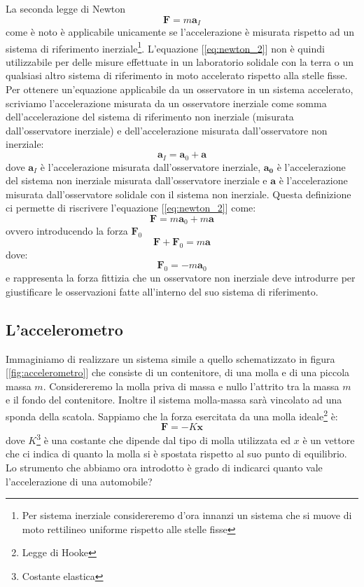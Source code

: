 \documentclass[a4paper,10pt,oneside]{article}
\begin{document}
La seconda legge di Newton
\begin{equation}\label{eq:newton_2}
 \mathbf{F}=m\mathbf{a}_I
\end{equation}
come è noto è applicabile unicamente se l'accelerazione è misurata rispetto ad un sistema di riferimento inerziale\footnote{Per sistema inerziale considereremo d'ora innanzi un sistema che si muove di moto rettilineo uniforme rispetto alle stelle fisse}. L'equazione [\ref{eq:newton_2}] non è quindi utilizzabile per delle misure effettuate in un laboratorio solidale con la terra o un qualsiasi altro sistema di riferimento in moto accelerato rispetto alla stelle fisse. Per ottenere un'equazione applicabile da un osservatore in un sistema accelerato, scriviamo l'accelerazione misurata da un osservatore inerziale come somma dell'accelerazione del sistema di riferimento non inerziale (misurata dall'osservatore inerziale) e dell'accelerazione misurata dall'osservatore non inerziale:
\begin{equation}
 \mathbf{a}_I=\mathbf{a}_0+\mathbf{a}
\end{equation}
dove $\mathbf{a}_I$ è l'accelerazione misurata dall'osservatore inerziale, $\mathbf{a_0}$ è l'accelerazione del sistema non inerziale misurata dall'osservatore inerziale e $\mathbf{a}$ è l'accelerazione misurata dall'osservatore solidale con il sistema non inerziale.
Questa definizione ci permette di riscrivere l'equazione [\ref{eq:newton_2}] come:
\begin{equation}
 \mathbf{F}=m\mathbf{a}_0+m\mathbf{a}
\end{equation}
ovvero introducendo la forza $\mathbf{F}_0$
\begin{equation}\label{eq:fittizia_2}
 \mathbf{F}+\mathbf{F}_0=m\mathbf{a}
\end{equation}
dove:
\begin{equation}\label{eq:forza_fittizia}
 \mathbf{F}_0=-m\mathbf{a}_0
\end{equation}
e rappresenta la forza fittizia che un osservatore non inerziale deve introdurre per giustificare le osservazioni fatte all'interno del suo sistema di riferimento.

\subsection*{L'accelerometro}
Immaginiamo di realizzare un sistema simile a quello schematizzato in figura [\ref{fig:accelerometro}] che consiste di un contenitore, di una molla  e di una piccola massa $m$. Considereremo la molla priva di massa e nullo l'attrito tra la massa $m$ e il fondo del contenitore. Inoltre il sistema molla-massa sarà vincolato ad una sponda della scatola. Sappiamo che la forza esercitata da una molla ideale\footnote{Legge di Hooke} è:
\begin{equation}
 \mathbf{F}=-K\mathbf{x}
\end{equation}
dove $K$\footnote{Costante elastica} è una costante che dipende dal tipo di molla utilizzata ed $x$ è un vettore che ci indica di quanto la molla si è spostata rispetto al suo punto di equilibrio. Lo strumento che abbiamo ora introdotto è grado di indicarci quanto vale l'accelerazione di una automobile?
\end{document}
